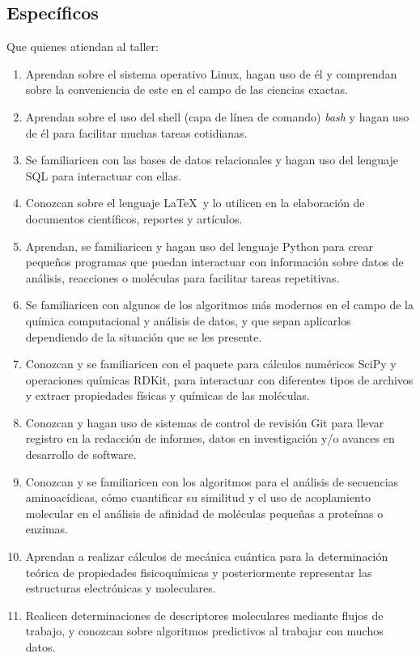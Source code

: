 \documentclass[10pt,letterpaper]{article}
\begin{document}
\subsection{Espec\'ificos}
Que quienes atiendan al taller:
\begin{enumerate}
\item Aprendan sobre el sistema operativo Linux, hagan uso de \'el y comprendan sobre la conveniencia de este en el campo de las ciencias exactas.
\item Aprendan sobre el uso del shell (capa de l\'inea de comando) \emph{bash} y hagan uso de \'el para facilitar muchas tareas cotidianas.
\item Se familiaricen con las bases de datos relacionales y hagan uso del lenguaje SQL para interactuar con ellas.
\item Conozcan sobre el lenguaje \LaTeX\ y lo utilicen en la elaboraci\'on de documentos cient\'ificos, reportes y art\'iculos.
\item Aprendan, se familiaricen y hagan uso del lenguaje Python para crear peque\~nos programas que puedan interactuar con informaci\'on sobre datos de an\'alisis, reacciones o mol\'eculas para facilitar tareas repetitivas.
\item Se familiaricen con algunos de los algoritmos m\'as modernos en el campo de la qu\'imica computacional y an\'alisis de datos, y que sepan aplicarlos dependiendo de la situaci\'on que se les presente.
\item Conozcan y se familiaricen con el paquete para c\'alculos num\'ericos SciPy y operaciones qu\'imicas RDKit, para interactuar con diferentes tipos de archivos y extraer propiedades f\'isicas y qu\'imicas de las mol\'eculas.
\item Conozcan y hagan uso de sistemas de control de revisi\'on Git para llevar registro en la redacci\'on de informes, datos en investigaci\'on y/o avances en desarrollo de software.
\item Conozcan y se familiaricen con los algoritmos para el an\'alisis de secuencias aminoac\'idicas, c\'omo cuantificar su similitud y el uso de acoplamiento molecular en el an\'alisis de afinidad de mol\'eculas peque\~nas a prote\'inas o enzimas.
\item Aprendan a realizar c\'alculos de mec\'anica cu\'antica para la determinaci\'on te\'orica de propiedades fisicoqu\'imicas y posteriormente representar las estructuras electr\'onicas y moleculares.
\item Realicen determinaciones de descriptores moleculares mediante flujos de trabajo, y conozcan sobre algoritmos predictivos al trabajar con muchos datos.

\end{enumerate}
\end{document}
